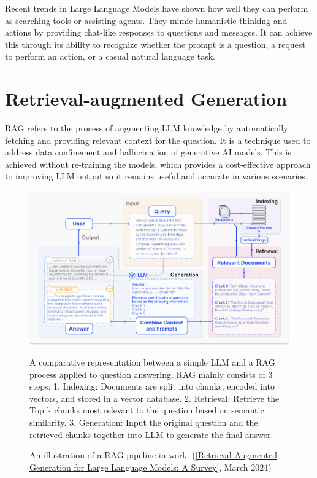 Recent trends in Large Language Models have shown how well they can perform as searching tools or assisting agents. They mimic humanistic thinking and actions by providing chat-like responses to questions and messages. It can achieve this through its ability to recognize whether the prompt is a question, a request to perform an action, or a casual natural language task.
\newpage

\section{Retrieval-augmented Generation}
RAG refers to the process of augmenting LLM knowledge by automatically fetching and providing relevant context for the question. It is a technique used to address data confinement and hallucination of generative AI models. This is achieved without re-training the models, which provides a cost-effective approach to improving LLM output so it remains useful and accurate in various scenarios.
\begin{figure}[htbp]
    \centering
    \includegraphics[width=\linewidth]{./figures/RAG_case.png}
    \caption{An illustration of a RAG pipeline in work. (\href{https://arxiv.org/html/2312.10997v5}{[Retrieval-Augmented Generation for Large Language Models: A Survey]}, March 2024)}
    \begin{flushleft}
        \small A comparative representation between a simple LLM and a RAG process applied to question answering. RAG mainly consists of 3 steps: 1. Indexing: Documents are split into chunks, encoded into vectors, and stored in a vector database. 2. Retrieval: Retrieve the Top k chunks most relevant to the question based on semantic similarity. 3. Generation: Input the original question and the retrieved chunks together into LLM to generate the final answer.
    \end{flushleft}
\end{figure}
\newpage

